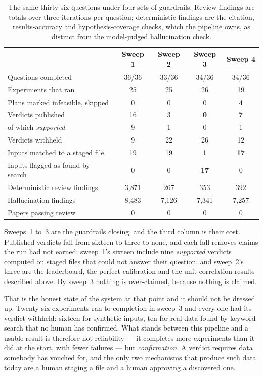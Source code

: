 \begin{table}[htbp]
\centering\small
\caption{The same thirty-six questions under four sets of guardrails. Review
findings are totals over three iterations per question; deterministic findings are
the citation, results-accuracy and hypothesis-coverage checks, which the pipeline
owns, as distinct from the model-judged hallucination check.}
\label{tab:three-sweeps}
\begin{tabularx}{\textwidth}{Xcccc}
\toprule
& \textbf{Sweep 1} & \textbf{Sweep 2} & \textbf{Sweep 3} & \textbf{Sweep 4} \\
\midrule
Questions completed                & 36/36 & 33/36 & 34/36 & 34/36 \\
Experiments that ran               & 25    & 25    & 26    & 19 \\
Plans marked infeasible, skipped   & 0     & 0     & 0     & \textbf{4} \\
Verdicts published                 & 16    & 3     & \textbf{0} & \textbf{7} \\
\quad of which \emph{supported}    & 9     & 1     & 0     & 1 \\
Verdicts withheld                  & 9     & 22    & 26    & 12 \\
Inputs matched to a staged file    & 19    & 19    & \textbf{1} & \textbf{17} \\
Inputs flagged as found by search  & 0     & 0     & \textbf{17} & 0 \\
Deterministic review findings      & 3{,}871 & 267 & 353   & 392 \\
Hallucination findings             & 8{,}483 & 7{,}126 & 7{,}341 & 7{,}257 \\
Papers passing review              & 0     & 0     & 0     & 0 \\
\bottomrule
\end{tabularx}
\end{table}

Sweeps~1 to~3 are the guardrails closing, and the third column is their cost.
Published verdicts fall from sixteen to three to none, and each fall removes claims
the run had not earned: sweep~1's sixteen include nine \emph{supported} verdicts
computed on staged files that could not answer their question, and sweep~2's three
are the leaderboard, the perfect-calibration and the unit-correlation results
described above. By sweep~3 nothing is over-claimed, because nothing is claimed.

That is the honest state of the system at that point and it should not be dressed
up. Twenty-six experiments ran to completion in sweep~3 and every one had its
verdict withheld: sixteen for synthetic inputs, ten for real data found by keyword
search that no human has confirmed. What stands between this pipeline and a usable
result is therefore not reliability --- it completes more experiments than it did at
the start, with fewer failures --- but \emph{confirmation}. A verdict requires data
somebody has vouched for, and the only two mechanisms that produce such data today
are a human staging a file and a human approving a discovered one.

